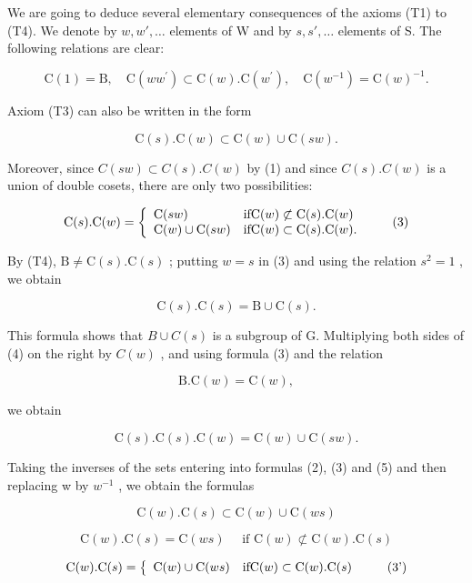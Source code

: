 We are going to deduce several elementary consequences of the axioms (T1) to (T4). We denote by \(w, w', \ldots\) elements of W and by \(s, s', \ldots\) elements of S. The following relations are clear:

\[
\mathrm{C} (1) = \mathrm{B}, \quad \mathrm{C} (w w ^ {\prime}) \subset \mathrm{C} (w). \mathrm{C} (w ^ {\prime}), \quad \mathrm{C} (w ^ {- 1}) = \mathrm{C} (w) ^ {- 1}.\tag{1}
\]

Axiom (T3) can also be written in the form

\[
\mathrm{C} (s). \mathrm{C} (w) \subset \mathrm{C} (w) \cup \mathrm{C} (s w).\tag{2}
\]

Moreover, since \(C(sw) \subset C(s).C(w)\) by (1) and since \(C(s).C(w)\) is a union of double cosets, there are only two possibilities:

\[
\mathrm{C} (s). \mathrm{C} (w) = \left\{ \begin{array}{l l} \mathrm{C} (s w) & \text {if} \mathrm{C} (w) \not \subset \mathrm{C} (s). \mathrm{C} (w) \\ \mathrm{C} (w) \cup \mathrm{C} (s w) & \text {if} \mathrm{C} (w) \subset \mathrm{C} (s). \mathrm{C} (w). \end{array} \right.\tag{3}
\]

By (T4), \(\mathrm{B} \neq \mathrm{C}(s). \mathrm{C}(s)\) ; putting \(w = s\) in (3) and using the relation \(s^2 = 1\) , we obtain

\[
\mathrm{C} (s). \mathrm{C} (s) = \mathrm{B} \cup \mathrm{C} (s).\tag{4}
\]

This formula shows that \(B \cup C(s)\) is a subgroup of G. Multiplying both sides of (4) on the right by \(C(w)\) , and using formula (3) and the relation

\[
\mathrm{B.C} (w) = \mathrm{C} (w),
\]

we obtain

\[
\mathrm{C} (s). \mathrm{C} (s). \mathrm{C} (w) = \mathrm{C} (w) \cup \mathrm{C} (s w).\tag{5}
\]

Taking the inverses of the sets entering into formulas (2), (3) and (5) and then replacing w by \(w^{-1}\) , we obtain the formulas

\[
\mathrm{C} (w). \mathrm{C} (s) \subset \mathrm{C} (w) \cup \mathrm{C} (w s)\tag{(2')}
\]

\[
\mathrm{C} (w). \mathrm{C} (s) = \mathrm{C} (w s) \quad \text {   if   } \mathrm{C} (w) \not \subset \mathrm{C} (w). \mathrm{C} (s)
\]

\[
\mathrm{C} (w). \mathrm{C} (s) = \left\{ \begin{array}{l l} \mathrm{C} (w) \cup \mathrm{C} (w s) & \text {if} \mathrm{C} (w) \subset \mathrm{C} (w). \mathrm{C} (s) \end{array} \right.\tag{3'}
\]

